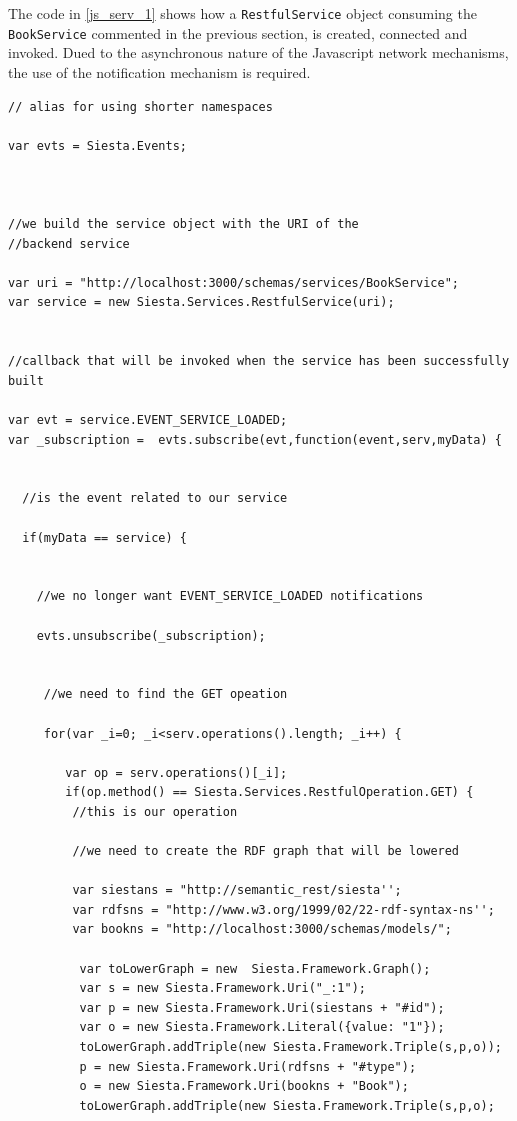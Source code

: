 The code in \ref{js_serv_1} shows how a \texttt{RestfulService} object consuming the \texttt{BookService} commented in
the previous section, is created, connected and invoked. Dued to the
asynchronous nature of the Javascript network mechanisms, the use of the notification mechanism is required.

\vspace{5 mm}
\begin{lstlisting}
// alias for using shorter namespaces

var evts = Siesta.Events;



//we build the service object with the URI of the 
//backend service

var uri = "http://localhost:3000/schemas/services/BookService";
var service = new Siesta.Services.RestfulService(uri);


//callback that will be invoked when the service has been successfully built

var evt = service.EVENT_SERVICE_LOADED;
var _subscription =  evts.subscribe(evt,function(event,serv,myData) {

  
  //is the event related to our service

  if(myData == service) {


    //we no longer want EVENT_SERVICE_LOADED notifications

    evts.unsubscribe(_subscription);


     //we need to find the GET opeation

     for(var _i=0; _i<serv.operations().length; _i++) {

        var op = serv.operations()[_i];
        if(op.method() == Siesta.Services.RestfulOperation.GET) {
         //this is our operation

         //we need to create the RDF graph that will be lowered

         var siestans = "http://semantic_rest/siesta'';
         var rdfsns = "http://www.w3.org/1999/02/22-rdf-syntax-ns'';
         var bookns = "http://localhost:3000/schemas/models/";

          var toLowerGraph = new  Siesta.Framework.Graph();
          var s = new Siesta.Framework.Uri("_:1");
          var p = new Siesta.Framework.Uri(siestans + "#id");
          var o = new Siesta.Framework.Literal({value: "1"});
          toLowerGraph.addTriple(new Siesta.Framework.Triple(s,p,o));
          p = new Siesta.Framework.Uri(rdfsns + "#type");
          o = new Siesta.Framework.Uri(bookns + "Book");
          toLowerGraph.addTriple(new Siesta.Framework.Triple(s,p,o);



\end{lstlisting}
